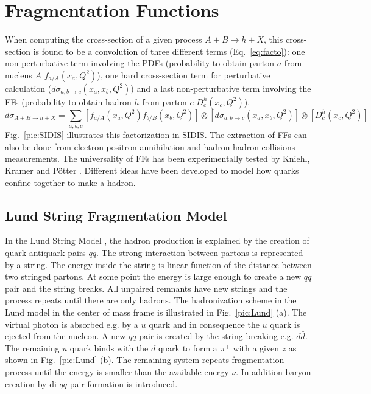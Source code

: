 
\section{Fragmentation Functions}\label{sec:FF}

When computing the cross-section of a given process $A+B \rightarrow h+X$, this cross-section is found to be a convolution of three different terms (Eq.~\ref{eq:facto}): one non-perturbative term involving the PDFs (probability to obtain parton $a$ from nucleus $A$ $f_{a/A}(x_a,Q^2)$), one hard cross-section term for perturbative calculation ($d\sigma_{a,b \rightarrow c}(x_a,x_b,Q^2)$) and a last non-perturbative term involving the FFs (probability to obtain hadron $h$ from parton $c$ $D^h_c(x_c,Q^2)$).
%
\begin{equation}
  d\sigma_{A+B \rightarrow h+X} = \sum_{a,b,c} \left[ f_{a/A}(x_a,Q^2) f_{b/B}(x_b,Q^2) \right] \otimes \left[ d\sigma_{a,b \rightarrow c}(x_a,x_b,Q^2) \right] \otimes \left[ D^h_c(x_c,Q^2) \right]
  \label{eq:facto}
\end{equation}
%
Fig.~\ref{pic:SIDIS} illustrates this factorization in SIDIS. The extraction of FFs can also be done from electron-positron annihilation and hadron-hadron collisions measurements. The universality of FFs has been experimentally tested by Kniehl, Kramer and Pötter \cite{Universality}. Different ideas have been developed to model how quarks confine together to make a hadron.

\subsection{Lund String Fragmentation Model}

In the Lund String Model \cite{LUND}, the hadron production is explained by the creation of quark-antiquark pairs $q\bar{q}$. The strong interaction between partons is represented by a string. The energy inside the string is linear function of the distance between two stringed partons. At some point the energy is large enough to create a new $q\bar{q}$ pair and the string breaks. All unpaired remnants have new strings and the process repeats until there are only hadrons. The hadronization scheme in the Lund model in the center of mass frame is illustrated in Fig.~\ref{pic:Lund} (a). The virtual photon is absorbed e.g. by a $u$ quark and in consequence the $u$ quark is ejected from the nucleon. A new $q\bar{q}$ pair is created by the string breaking e.g. $d\bar{d}$. The remaining $u$ quark binds with the $\bar{d}$ quark to form a $\pi^+$ with a given $z$ as shown in Fig.~\ref{pic:Lund} (b). The remaining system repeats fragmentation process until the energy is smaller than the available energy $\nu$. In addition baryon creation by di-$q\bar{q}$ pair formation is introduced.

